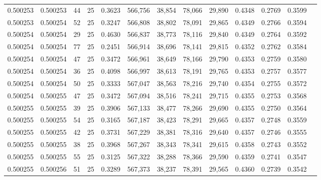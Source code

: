 \begin{tabular}{rrrrrrrrrrrrr}
0.500253 & 0.500253 &    44 &  25 &                                     0.3623 & 566,756 &  38,854 &  78,066 &  29,890 & 0.4348 & 0.2769 & 0.3599 \\
0.500253 & 0.500254 &    52 &  25 &                                     0.3247 & 566,808 &  38,802 &  78,091 &  29,865 & 0.4349 & 0.2766 & 0.3594 \\
0.500254 & 0.500254 &    29 &  25 &                                     0.4630 & 566,837 &  38,773 &  78,116 &  29,840 & 0.4349 & 0.2764 & 0.3592 \\
0.500254 & 0.500254 &    77 &  25 &                                     0.2451 & 566,914 &  38,696 &  78,141 &  29,815 & 0.4352 & 0.2762 & 0.3584 \\
0.500254 & 0.500254 &    47 &  25 &                                     0.3472 & 566,961 &  38,649 &  78,166 &  29,790 & 0.4353 & 0.2759 & 0.3580 \\
0.500254 & 0.500254 &    36 &  25 &                                     0.4098 & 566,997 &  38,613 &  78,191 &  29,765 & 0.4353 & 0.2757 & 0.3577 \\
0.500254 & 0.500254 &    50 &  25 &                                     0.3333 & 567,047 &  38,563 &  78,216 &  29,740 & 0.4354 & 0.2755 & 0.3572 \\
0.500254 & 0.500255 &    47 &  25 &                                     0.3472 & 567,094 &  38,516 &  78,241 &  29,715 & 0.4355 & 0.2753 & 0.3568 \\
0.500255 & 0.500255 &    39 &  25 &                                     0.3906 & 567,133 &  38,477 &  78,266 &  29,690 & 0.4355 & 0.2750 & 0.3564 \\
0.500255 & 0.500255 &    54 &  25 &                                     0.3165 & 567,187 &  38,423 &  78,291 &  29,665 & 0.4357 & 0.2748 & 0.3559 \\
0.500255 & 0.500255 &    42 &  25 &                                     0.3731 & 567,229 &  38,381 &  78,316 &  29,640 & 0.4357 & 0.2746 & 0.3555 \\
0.500255 & 0.500255 &    38 &  25 &                                     0.3968 & 567,267 &  38,343 &  78,341 &  29,615 & 0.4358 & 0.2743 & 0.3552 \\
0.500255 & 0.500255 &    55 &  25 &                                     0.3125 & 567,322 &  38,288 &  78,366 &  29,590 & 0.4359 & 0.2741 & 0.3547 \\
0.500255 & 0.500256 &    51 &  25 &                                     0.3289 & 567,373 &  38,237 &  78,391 &  29,565 & 0.4360 & 0.2739 & 0.3542 \\

\end{tabular}
